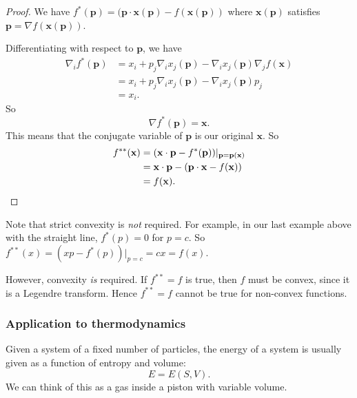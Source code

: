 \documentclass[a4paper]{article}
\begin{document}
\begin{proof}
  We have $f^*(\mathbf{p}) = (\mathbf{p}\cdot\mathbf{x}(\mathbf{p}) - f(\mathbf{x}(\mathbf{p}))$ where $\mathbf{x}(\mathbf{p})$ satisfies $\mathbf{p} = \nabla f(\mathbf{x}(\mathbf{p}))$.

  Differentiating with respect to $\mathbf{p}$, we have
  \begin{align*}
    \nabla_i f^*(\mathbf{p}) &= x_i + p_j \nabla_i x_j (\mathbf{p}) - \nabla_i x_j(\mathbf{p}) \nabla_j f(\mathbf{x})\\
    &= x_i + p_j \nabla_i x_j(\mathbf{p}) - \nabla_i x_j(\mathbf{p}) p_j\\
    &= x_i.
  \end{align*}
  So
  \[
    \nabla f^*(\mathbf{p}) = \mathbf{x}.
  \]
  This means that the conjugate variable of $\mathbf{p}$ is our original $\mathbf{x}$. So
  \begin{align*}
    f^{**}(\mathbf{x}) &= (\mathbf{x} \cdot \mathbf{p} - f^*(\mathbf{p}))|_{\mathbf{p} = \mathbf{p}(\mathbf{x})}\\
    &= \mathbf{x}\cdot \mathbf{p} - (\mathbf{p}\cdot \mathbf{x} - f(\mathbf{x}))\\
    &= f(\mathbf{x}). \qedhere
  \end{align*}
\end{proof}
Note that strict convexity is \emph{not} required. For example, in our last example above with the straight line, $f^*(p) = 0$ for $p = c$. So $f^{**}(x) = (xp - f^*(p))|_{p = c} = cx = f(x)$.

However, convexity \emph{is} required. If $f^{**} = f$ is true, then $f$ must be convex, since it is a Legendre transform. Hence $f^{**} = f$ cannot be true for non-convex functions.

\subsubsection*{Application to thermodynamics}
Given a system of a fixed number of particles, the energy of a system is usually given as a function of entropy and volume:
\[
  E = E(S, V).
\]
We can think of this as a gas inside a piston with variable volume.
\end{document}
